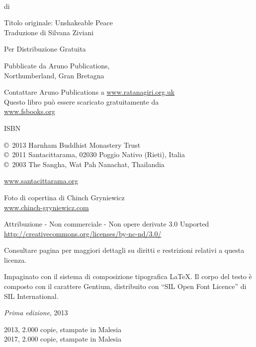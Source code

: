 {\small\setlength{\parskip}{0.8em}\setlength{\parindent}{0em}%
{\raggedright%

\thetitle\\
di \theauthor

Titolo originale: Unshakeable Peace\\
Traduzione di Silvana Ziviani

Per Distribuzione Gratuita

Pubblicate da Aruno Publications,\\
Northumberland, Gran Bretagna

Contattare Aruno Publications a \href{http://ratanagiri.org.uk}{www.ratanagiri.org.uk}\\
Questo libro può essere scaricato gratuitamente da\\
\href{http://fsbooks.org/}{www.fsbooks.org}

ISBN \theISBN

\copyright\ 2013 Harnham Buddhist Monastery Trust\\
\copyright\ 2011 Santacittarama, 02030 Poggio Nativo (Rieti), Italia\\
\copyright\ 2003 The Sangha, Wat Pah Nanachat, Thailandia

\href{http://www.santacittarama.org/}{www.santacittarama.org}

Foto di copertina di Chinch Gryniewicz\\
\href{http://chinch-gryniewicz.com}{www.chinch-gryniewicz.com}

\vfill

{\footnotesize
Attribuzione - Non commerciale - Non opere derivate 3.0 Unported\\
\href{http://creativecommons.org/licenses/by-nc-nd/3.0/}{http://creativecommons.org/licenses/by-nc-nd/3.0/}

Consultare pagina \pageref{copyright-details} per maggiori dettagli su diritti e restrizioni relativi a questa licenza.

Impaginato con il sistema di composizione tipografica {\selectfont\LaTeX}. Il corpo del testo è composto con il carattere Gentium, distribuito con ``SIL Open Font Licence'' di SIL International.

\textit{Prima edizione}, 2013

2013, 2.000 copie, stampate in Malesia\\
2017, 2.000 copie, stampate in Malesia

}
}}


